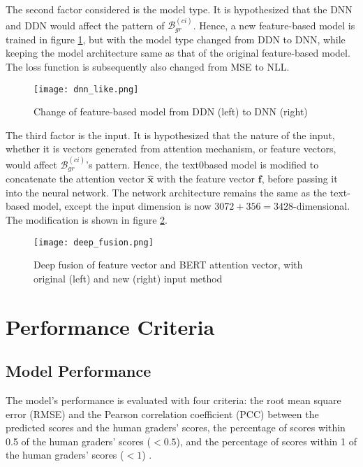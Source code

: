 The second factor considered is the model type. It is hypothesized that the DNN and DDN would affect the pattern of $\mathcal{B}^{(ci)}_{gr}$. Hence, a new feature-based model is trained in figure \ref{fig:dnn_like}, but with the model type changed from DDN to DNN, while keeping the model architecture same as that of the original feature-based model. The loss function is subsequently also changed from MSE to NLL.

\begin{figure}[H]
    \centering
    \texttt{[image: dnn\_like.png]}
    \caption{Change of feature-based model from DDN (left) to DNN (right)}
    \label{fig:dnn_like}
\end{figure}

The third factor is the input. It is hypothesized that the nature of the input, whether it is vectors generated from attention mechanism, or feature vectors, would affect $\mathcal{B}^{(ci)}_{gr}$'s pattern. Hence, the text0based model is modified to concatenate the attention vector $\mathbf{\hat{x}}$ with the feature vector $\mathbf{f}$, before passing it into the neural network. The network architecture remains the same as the text-based model, except the input dimension is now $3072 + 356 = 3428$-dimensional. The modification is shown in figure \ref{fig:deep_fusion}.

\begin{figure}[H]
    \centering
    \texttt{[image: deep\_fusion.png]}
    \caption{Deep fusion of feature vector and BERT attention vector, with original (left) and new (right) input method}
    \label{fig:deep_fusion}
\end{figure}

\section{Performance Criteria} \label{sec:performance_criteria}
\subsection{Model Performance}
The model's performance is evaluated with four criteria: the root mean square error (RMSE) and the Pearson correlation coefficient (PCC)  between the predicted scores and the human graders' scores, the percentage of scores within 0.5 of the human graders' scores ($< 0.5$),   and the percentage of scores within 1 of the human graders' scores ($< 1$) .

